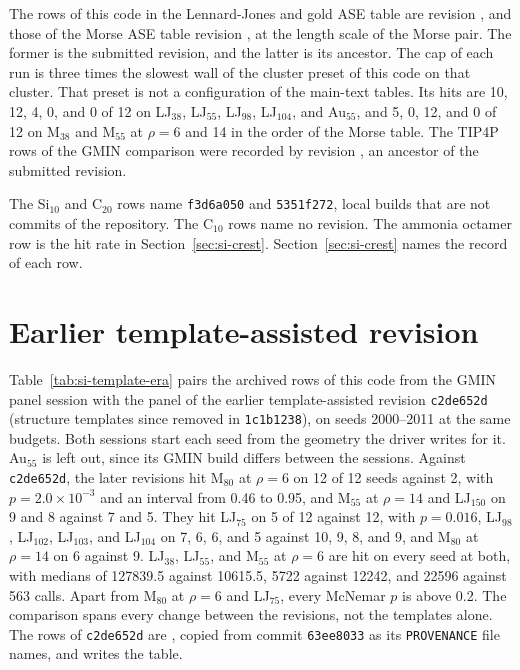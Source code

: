 \documentclass[journal=jctcce,manuscript=suppinfo]{achemso}
\begin{document}
The rows of this code in the Lennard-Jones and gold ASE table are revision
\texttt{}, and those of
the Morse ASE table revision
\texttt{}, at the length
scale of the Morse pair.
The former is the submitted revision, and the latter is its ancestor.
The cap of each run is three times the slowest wall of the cluster preset of
this code on that cluster.
That preset is not a configuration of the main-text tables.
Its hits are 10, 12, 4, 0, and 0 of 12 on LJ\(_{38}\), LJ\(_{55}\),
LJ\(_{98}\), LJ\(_{104}\), and Au\(_{55}\), and 5, 0, 12, and 0 of 12 on
M\(_{38}\) and M\(_{55}\) at \(\rho=6\) and 14 in the order of the Morse table.
The TIP4P rows of the GMIN comparison were recorded by revision
\texttt{}, an ancestor
of the submitted revision.

The Si\(_{10}\) and C\(_{20}\) rows name \texttt{f3d6a050} and
\texttt{5351f272}, local builds that are not commits of the repository.
The C\(_{10}\) rows name no revision.
The ammonia octamer row is the hit rate in Section~\ref{sec:si-crest}.
Section~\ref{sec:si-crest} names the record of each row.

\section{Earlier template-assisted revision}
\label{sec:si-template-era}
Table~\ref{tab:si-template-era} pairs the archived rows of this code from the
GMIN panel session with the panel of the earlier template-assisted revision
\texttt{c2de652d} (structure templates since removed in
\texttt{1c1b1238}), on seeds 2000--2011 at the same budgets.
Both sessions start each seed from the geometry the driver writes for it.
Au\(_{55}\) is left out, since its GMIN build differs between the sessions.
Against \texttt{c2de652d}, the later revisions hit M\(_{80}\) at \(\rho=6\)
on 12 of 12 seeds against 2, with \(p=2.0\times 10^{-3}\) and an interval
from 0.46 to 0.95, and M\(_{55}\) at \(\rho=14\) and LJ\(_{150}\) on 9 and 8
against 7 and 5.
They hit LJ\(_{75}\) on 5 of 12 against 12, with \(p=0.016\), LJ\(_{98}\),
LJ\(_{102}\), LJ\(_{103}\), and LJ\(_{104}\) on 7, 6, 6, and 5 against 10,
9, 8, and 9, and M\(_{80}\) at \(\rho=14\) on 6 against 9.
LJ\(_{38}\), LJ\(_{55}\), and M\(_{55}\) at \(\rho=6\) are hit on every seed
at both, with medians of 127839.5 against 10615.5, 5722 against 12242, and
22596 against 563 calls.
Apart from M\(_{80}\) at \(\rho=6\) and LJ\(_{75}\), every McNemar \(p\) is
above 0.2.
The comparison spans every change between the revisions, not the templates
alone.
The rows of \texttt{c2de652d} are ,
copied from commit \texttt{63ee8033} as its \texttt{PROVENANCE} file names,
and  writes the table.
\end{document}
